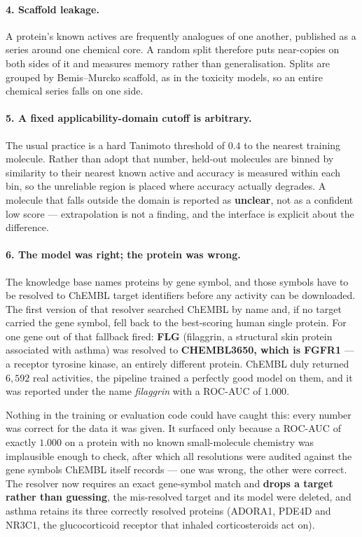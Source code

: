 \paragraph{4. Scaffold leakage.} A protein's known actives are frequently analogues of one
another, published as a series around one chemical core. A random split therefore puts near-copies
on both sides of it and measures memory rather than generalisation. Splits are grouped by
Bemis--Murcko scaffold, as in the toxicity models, so an entire chemical series falls on one side.

\paragraph{5. A fixed applicability-domain cutoff is arbitrary.} The usual practice is a hard
Tanimoto threshold of $0.4$ to the nearest training molecule. Rather than adopt that number,
held-out molecules are binned by similarity to their nearest known active and accuracy is measured
within each bin, so the unreliable region is placed where accuracy actually degrades. A molecule
that falls outside the domain is reported as \textbf{unclear}, not as a confident low score ---
extrapolation is not a finding, and the interface is explicit about the difference.

\paragraph{6. The model was right; the protein was wrong.} The knowledge base names proteins by
gene symbol, and those symbols have to be resolved to ChEMBL target identifiers before any
activity can be downloaded. The first version of that resolver searched ChEMBL by name and, if no
target carried the gene symbol, fell back to the best-scoring human single protein. For one gene
out of \TgtNProteins{} that fallback fired: \textbf{FLG} (filaggrin, a structural skin protein
associated with asthma) was resolved to \textbf{CHEMBL3650, which is FGFR1} --- a receptor
tyrosine kinase, an entirely different protein. ChEMBL duly returned $6{,}592$ real activities,
the pipeline trained a perfectly good model on them, and it was reported under the name
\emph{filaggrin} with a ROC-AUC of $1.000$.

Nothing in the training or evaluation code could have caught this: every number was correct for
the data it was given. It surfaced only because a ROC-AUC of exactly $1.000$ on a protein with no
known small-molecule chemistry was implausible enough to check, after which all
\TgtNProteins{} resolutions were audited against the gene symbols ChEMBL itself records
--- one was wrong, the other \TgtNProteins{} were correct. The resolver now requires an exact
gene-symbol match and \textbf{drops a target rather than guessing}, the mis-resolved target and
its model were deleted, and asthma retains its three correctly resolved proteins (ADORA1, PDE4D
and NR3C1, the glucocorticoid receptor that inhaled corticosteroids act on).

